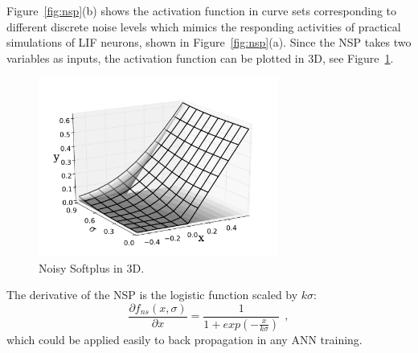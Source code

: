 	Figure~\ref{fig:nsp}(b) shows the activation function in curve sets corresponding to different discrete noise levels which mimics the responding activities of practical simulations of LIF neurons, shown in Figure~\ref{fig:nsp}(a).
	Since the NSP takes two variables as inputs, the activation function can be plotted in 3D, see Figure~\ref{Fig:NSP3D}.
	
	\begin{figure}[bt]
		\centering
		\includegraphics[width=0.7\textwidth]{pics_iconip/5.pdf}
		\caption{Noisy Softplus in 3D.}
		\label{Fig:NSP3D}
	\end{figure}

	The derivative of the NSP is the logistic function scaled by $k\sigma$:
	\begin{equation}
	\frac{\partial f_{ns}(x,\sigma)}{\partial x} = \frac{1}{1+exp(-\frac{x}{k\sigma})}~~,
	\label{equ:logist}
	\end{equation}	
	which could be applied easily to back propagation in any ANN training.	
	
	
